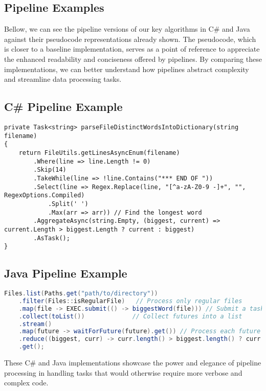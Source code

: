 \subsection{Pipeline Examples}
Bellow, we can see the pipeline versions of our key algorithms in C\# and Java against their pseudocode representations already shown. The pseudocode, which is closer to a baseline implementation, serves as a point of reference to appreciate the enhanced readability and conciseness offered by pipelines. By comparing these implementations, we can better understand how pipelines abstract complexity and streamline data processing tasks.

\clearpage

\lstset{basicstyle=\footnotesize\ttfamily} %

\subsection*{C\# Pipeline Example}

\begin{lstlisting}[language={[Sharp]C}, caption={C\# Pipeline for Parsing Distinct Words into a Dictionary}]
private Task<string> parseFileDistinctWordsIntoDictionary(string filename)
{
    return FileUtils.getLinesAsyncEnum(filename)
        .Where(line => line.Length != 0)   
        .Skip(14)                          
        .TakeWhile(line => !line.Contains("*** END OF ")) 
        .Select(line => Regex.Replace(line, "[^a-zA-Z0-9 -]+", "", RegexOptions.Compiled)
            .Split(' ')
            .Max(arr => arr)) // Find the longest word
        .AggregateAsync(string.Empty, (biggest, current) => current.Length > biggest.Length ? current : biggest) 
        .AsTask();
}
\end{lstlisting}

\subsection*{Java Pipeline Example}
\begin{lstlisting}[language=Java, caption={Java Pipeline for Finding the Largest Word in Files}]
Files.list(Paths.get("path/to/directory"))
    .filter(Files::isRegularFile)   // Process only regular files
    .map(file -> EXEC.submit(() -> biggestWord(file))) // Submit a task for each file
    .collect(toList())             // Collect futures into a list
    .stream()
    .map(future -> waitForFuture(future).get()) // Process each future
    .reduce((biggest, curr) -> curr.length() > biggest.length() ? curr : biggest) // Reduce to find the largest word
    .get();
\end{lstlisting}

\lstset{basicstyle=\normalsize\ttfamily} %

These C\# and Java implementations showcase the power and elegance of pipeline processing in handling tasks that would otherwise require more verbose and complex code.

